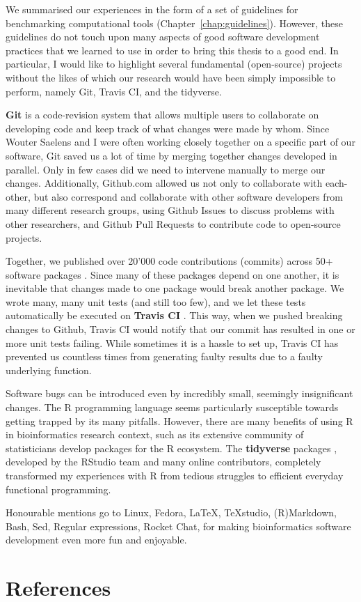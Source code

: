 We summarised our experiences in the form of a set of guidelines for benchmarking computational tools (Chapter~\ref{chap:guidelines}). However, these guidelines do not touch upon many aspects of good software development practices that we learned to use in order to bring this thesis to a good end. In particular, I would like to highlight several  fundamental (open-source) projects without the likes of which our research would have been simply impossible to perform, namely Git, Travis CI, and the tidyverse.

\textbf{Git} \cite{torvalds_gitfastversion_2005} is a code-revision system that allows multiple users to collaborate on developing code and keep track of what changes were made by whom. 
Since Wouter Saelens and I were often working closely together on a specific part of our software, Git saved us a lot of time by merging together changes developed in parallel. Only in few cases did we need to intervene manually to merge our changes.
Additionally, Github.com allowed us not only to collaborate with each-other, but also correspond and collaborate with other software developers from many different research groups, using Github Issues to discuss problems with other researchers, and Github Pull Requests to contribute code to open-source projects. 

Together, we published over 20'000 code contributions (commits) across 50+ software packages \cite{cannoodt_developmentdynverse_2019}. Since many of these packages depend on one another, it is inevitable that changes made to one package would break another package. We wrote many, many unit tests (and still too few), and we let these tests automatically be executed on \textbf{Travis CI} \cite{traviscigmbh_traviscitest_2011}. This way, when we pushed breaking changes to Github, Travis CI would notify that our commit has resulted in one or more unit tests failing. While sometimes it is a hassle to set up, Travis CI has prevented us countless times from generating faulty results due to a faulty underlying function.

Software bugs can be introduced even by incredibly small, seemingly insignificant changes. The R programming language seems particularly susceptible towards getting trapped by its many pitfalls. However, there are many benefits of using R in bioinformatics research context, such as its extensive community of statisticians develop packages for the R ecosystem. The \textbf{tidyverse} packages \cite{wickham_tidytoolsmanifesto_2017}, developed by the RStudio team and many online contributors, completely transformed my experiences with R from tedious struggles to efficient everyday functional programming.

Honourable mentions go to Linux, Fedora, \LaTeX, TeXstudio, (R)Markdown, Bash, Sed, Regular expressions, Rocket Chat, for making bioinformatics software development even more fun and enjoyable.




\clearpage
\section{References}
\printbibliography[heading=none]
